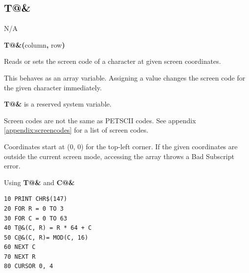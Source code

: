 \newpage
\subsection{T@\&}
\begin{description}[leftmargin=2cm,style=nextline]
\item [Token:]    N/A

\item [Format:]   {\bf T@\&(}column{\bf ,} row{\bf)}

\item [Usage:]    Reads or sets the screen code of a character at given screen coordinates.

                  This behaves as an array variable. Assigning a value changes the screen code for the given character immediately.

\item[Remarks:]   {\bf T@\&} is a reserved system variable.

                  Screen codes are not the same as PETSCII codes. See appendix \vref{appendix:screencodes} for a list of screen codes.

                  Coordinates start at (0, 0) for the top-left corner. If the given coordinates are outside the current screen mode, accessing the array throws a Bad Subscript error.

\item [Example:]  Using {\bf T@\&} and {\bf C@\&}

\begin{tcolorbox}[colback=black,coltext=white]
\verbatimfont{\codefont}
\begin{verbatim}
10 PRINT CHR$(147)
20 FOR R = 0 TO 3
30 FOR C = 0 TO 63
40 T@&(C, R) = R * 64 + C
50 C@&(C, R)= MOD(C, 16)
60 NEXT C
70 NEXT R
80 CURSOR 0, 4
\end{verbatim}
\end{tcolorbox}
\end{description}


\newpage
